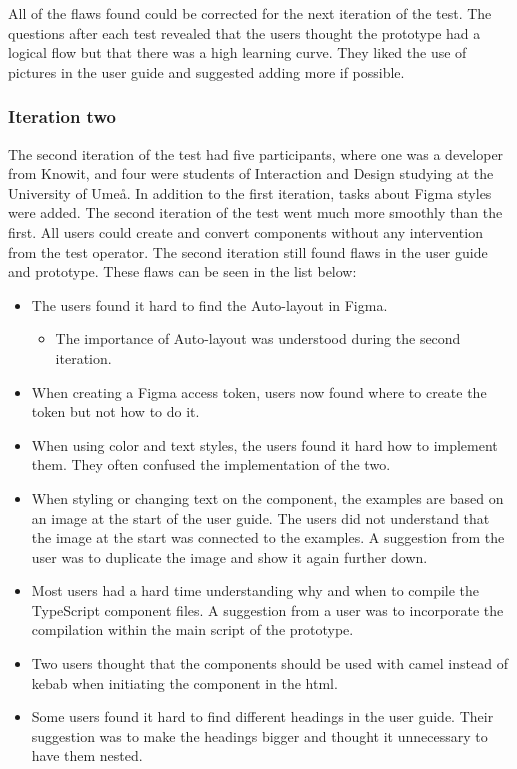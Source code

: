 All of the flaws found could be corrected for the next iteration of the test. The questions after each test revealed that the users thought the prototype had a logical flow but that there was a high learning curve. They liked the use of pictures in the user guide and suggested adding more if possible.  

\subsubsection{Iteration two}%
\label{ssub:Iteration two}
The second iteration of the test had five participants, where one was a developer from Knowit, and four were students of Interaction and Design studying at the University of Umeå. In addition to the first iteration, tasks about Figma styles were added. The second iteration of the test went much more smoothly than the first. All users could create and convert components without any intervention from the test operator. The second iteration still found flaws in the user guide and prototype. These flaws can be seen in the list below:

\begin{itemize}
   \item The users found it hard to find the Auto-layout in Figma.
      \begin{itemize}
         \item The importance of Auto-layout was understood during the second iteration.
      \end{itemize}
   \item When creating a Figma access token, users now found where to create the token but not how to do it.
   \item When using color and text styles, the users found it hard how to implement them. They often confused the implementation of the two. 
   \item When styling or changing text on the component, the examples are based on an image at the start of the user guide. The users did not understand that the image at the start was connected to the examples. A suggestion from the user was to duplicate the image and show it again further down.
   \item Most users had a hard time understanding why and when to compile the TypeScript component files. A suggestion from a user was to incorporate the compilation within the main script of the prototype.
   \item Two users thought that the components should be used with \gls{camel} instead of \gls{kebab} when initiating the component in the \acrshort{html}.
   \item Some users found it hard to find different headings in the user guide. Their suggestion was to make the headings bigger and thought it unnecessary to have them nested.
\end{itemize}

